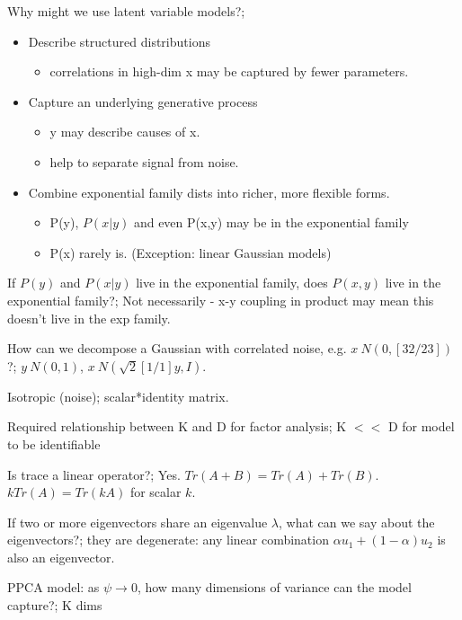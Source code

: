 \documentclass{article}
\begin{document}
Why might we use latent variable models?; \begin{itemize} \item Describe structured distributions \begin{itemize} \item correlations in high-dim x may be captured by fewer parameters.  \end{itemize} \item Capture an underlying generative process \begin{itemize} \item y may describe causes of x.  \item help to separate signal from noise.  \end{itemize} \item Combine exponential family dists into richer, more flexible forms.  \begin{itemize} \item P(y), $P(x|y)$ and even P(x,y) may be in the exponential family \item P(x) rarely is. (Exception: linear Gaussian models) \end{itemize} \end{itemize}

If $P(y)$ and $P(x|y)$ live in the exponential family, does $P(x,y)$ live in the exponential family?; Not necessarily - x-y coupling in product may mean this doesn't live in the exp family.

How can we decompose a Gaussian with correlated noise, e.g. $x~N(0, [ 3 2 / 2 3])$?; $y~N(0,1)$, $x~N(\sqrt{2}[1 / 1]y, I)$.

Isotropic (noise); scalar*identity matrix.

Required relationship between K and D for factor analysis; K $<<$ D for model to be identifiable

Is trace a linear operator?; Yes. $Tr(A+B) = Tr(A)+Tr(B)$. $kTr(A) = Tr(kA)$ for scalar $k$.

If two or more eigenvectors share an eigenvalue $\lambda$, what can we say about the eigenvectors?; they are degenerate: any linear combination $\alpha u_1 + (1-\alpha)u_2$ is also an eigenvector.

PPCA model: as $\psi\rightarrow 0$, how many dimensions of variance can the model capture?; K dims
\end{document}
